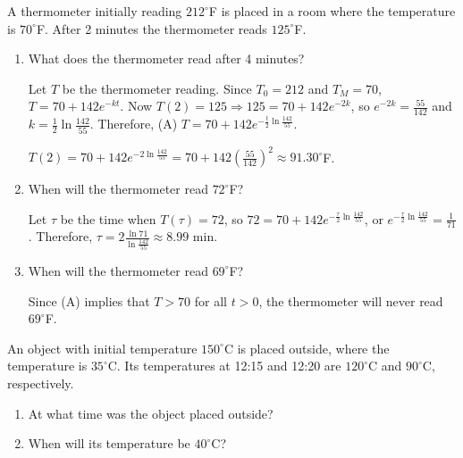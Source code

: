 \documentclass{ximera}
\begin{document}
\begin{problem}\label{exer:4.2.4}
A thermometer initially reading $212^\circ$F is placed in a
room where the temperature is $70^\circ$F.  After 2
minutes the thermometer reads $125^\circ$F.

\begin{enumerate}
\item %
What does the thermometer read after 4 minutes?

\begin{solution}
Let $T$ be the thermometer reading.
Since $T_0=212$ and $T_M=70$, $T=70+142e^{-kt}$. Now
$T(2)=125\Rightarrow 125=70+142e^{-2k}$, so
$e^{-2k}=\frac{55}{142}$
and $k=\frac{1}{2}\ln\frac{142}{55}$. Therefore,
(A) $T=70+142e^{-\frac{t}{2}\ln\frac{142}{55}}$.

$T(2)=70+142e^{-2\ln\frac{142}{55}}=70+142\left(\frac{55}{142}\right)^2
\approx91.30^\circ$F.
\end{solution}

\item %
When will the thermometer read $72^\circ$F?

\begin{solution}
Let $\tau$ be the time when
 $T(\tau)=72$, so $72=70+142e^{-\frac{\tau}{2}\ln\frac{142}{55}}$, or
$e^{-\frac{\tau}{2}\ln\frac{142}{55}}=\frac{1}{71}$. Therefore,
$\tau=2\frac{\ln71}{\ln\frac{142}{55}}\approx8.99$ min.
\end{solution}

\item %
When will the thermometer read $69^\circ$F?

\begin{solution}
Since (A) implies that $T>70$ for all $t>0$, the
thermometer will never read $69^\circ$F.
\end{solution}
\end{enumerate}
\end{problem}

\begin{problem}\label{exer:4.2.5}
An object with initial temperature $150^\circ$C is placed
outside, where the temperature is $35^\circ$C.  Its
temperatures at 12:15 and 12:20 are $120^\circ$C and
$90^\circ$C, respectively.

\begin{enumerate}
\item %
At what time was the object placed outside?

\item %
When will its temperature be $40^\circ$C?
\end{enumerate}
\end{problem}
\end{document}

